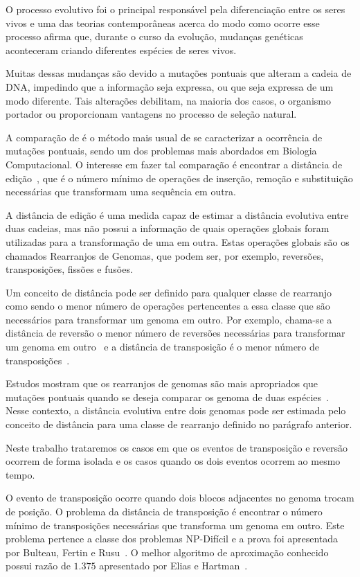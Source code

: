 O processo evolutivo foi o principal responsável pela diferenciação
entre os seres vivos e uma das teorias contemporâneas acerca do modo
como ocorre esse processo afirma que, durante o curso da evolução,
mudanças genéticas aconteceram criando diferentes espécies de seres
vivos.

Muitas dessas mudanças são devido a mutações pontuais que alteram a
cadeia de DNA, impedindo que a informação seja expressa, ou que seja
expressa de um modo diferente. Tais alterações debilitam, na maioria
dos casos, o organismo portador ou proporcionam vantagens no processo
de seleção natural.

A comparação de \seq{} é o método mais usual de se caracterizar a
ocorrência de mutações pontuais, sendo um dos problemas mais abordados
em Biologia Computacional. O interesse em fazer tal comparação é
encontrar a distância de edição~\cite{SetubalMeidanis*1997}, que é o
número mínimo de operações de inserção, remoção e substituição
necessárias que transformam uma sequência em outra.

A distância de edição é uma medida capaz de estimar a distância
evolutiva entre duas cadeias, mas não possui a informação de quais
operações globais foram utilizadas para a transformação de uma
\seq{} em outra. Estas operações globais são os chamados
Rearranjos de Genomas, que podem ser, por exemplo, reversões,
transposições, fissões e fusões.

Um conceito de distância pode ser definido para qualquer classe de
rearranjo como sendo o menor número de operações pertencentes a essa
classe que são necessários para transformar um genoma em outro. Por
exemplo, chama-se a distância de reversão o menor número de reversões
necessárias para transformar um genoma em
outro~\cite{BafnaPevzner*1996} e a distância de transposição é o menor
número de transposições~\cite{BafnaPevzner*1998}.

Estudos mostram que os rearranjos de genomas são mais apropriados que
mutações pontuais quando se deseja comparar os genoma de duas
espécies~\cite{PalmerHerbon*1988}. Nesse contexto, a distância
evolutiva entre dois genomas pode ser estimada pelo conceito de
distância para uma classe de rearranjo definido no parágrafo anterior.

Neste trabalho trataremos os casos em que os eventos de transposição e
reversão ocorrem de forma isolada e os casos quando os dois eventos
ocorrem ao mesmo tempo.

O evento de transposição ocorre quando dois blocos adjacentes no
genoma trocam de posição. O problema da distância de transposição é
encontrar o número mínimo de transposições necessárias que transforma
um genoma em outro. Este problema pertence a classe dos problemas
NP-Difícil e a prova foi apresentada por Bulteau, Fertin e
Rusu~\cite{BulteauFertinRusu*2010}. O melhor algoritmo de aproximação
conhecido possui razão de $1.375$ apresentado por Elias e
Hartman~\cite{EliasHartman*2006}.

